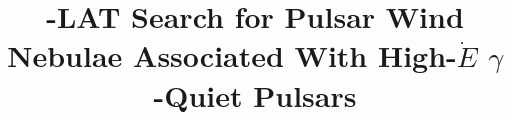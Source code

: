 \documentclass[12pt,preprint]{aastex}
\begin{document}
\title{\fermi-LAT Search for Pulsar Wind Nebulae Associated With High-$\dot E$ $\gamma$-Quiet Pulsars}










\appendix

\end{document}
